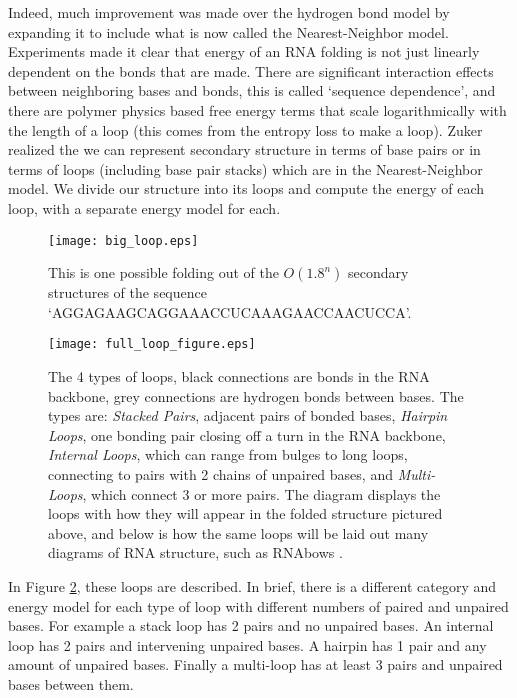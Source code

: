 Indeed, much improvement was made over the hydrogen bond model by
expanding it to include what is now called the Nearest-Neighbor
model. Experiments made it clear that energy of an RNA folding is not
just linearly dependent on the bonds that are made. There are
significant interaction effects between neighboring bases and bonds,
this is called `sequence dependence', and there are polymer physics
based free energy terms that scale logarithmically with the length of
a loop (this comes from the entropy loss to make a loop). Zuker
realized the we can represent secondary structure in terms of base
pairs or in terms of loops (including base pair stacks) which are in
the Nearest-Neighbor model. We divide our structure into its loops and
compute the energy of each loop, with a separate energy model for
each.



\begin{figure}[t]
\texttt{[image: big\_loop.eps]}
\caption[Example Secondary Structure]{This is one possible folding out of the $O(1.8^n)$ secondary
    structures of the sequence
    `AGGAGAAGCAGGAAACCUCAAAGAACCAACUCCA'. }
\label{fig:ssExample}
\end{figure}
\begin{figure}[t]

\texttt{[image: full\_loop\_figure.eps]}
\caption[Loop Types]{The 4 types of loops, black connections are bonds in the RNA
  backbone, grey connections are hydrogen bonds between bases. The
  types are: \textit{Stacked Pairs}, adjacent pairs of bonded bases,
  \textit{Hairpin Loops}, one bonding pair closing off a turn in the
  RNA backbone, \textit{Internal Loops}, which can range from bulges
  to long loops, connecting to pairs with 2 chains of unpaired bases,
  and \textit{Multi-Loops}, which connect 3 or more pairs. The diagram
  displays the loops with how they will appear in the folded structure
  pictured above, and below is how the same loops will be laid out
  many diagrams of RNA structure, such as RNAbows
  \cite{aalberts2013visualizing}.}
\label{fig:loopFigure}
\end{figure}

In Figure \ref{fig:loopFigure}, these loops are described. In brief,
there is a different category and energy model for each type of loop
with different numbers of paired and unpaired bases. For example a
stack loop has 2 pairs and no unpaired bases. An internal loop has 2
pairs and intervening unpaired bases. A hairpin has 1 pair and any
amount of unpaired bases. Finally a multi-loop has at least 3 pairs
and unpaired bases between them.

